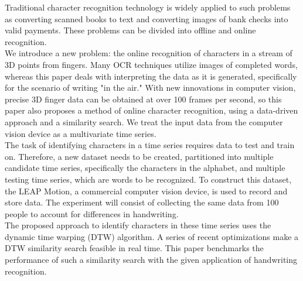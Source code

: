 Traditional character recognition technology is widely applied to such problems as converting scanned books to text and converting images of bank checks into valid payments. These problems can be divided into offline and online recognition.\\
We introduce a new problem: the online recognition of characters in a stream of 3D points from fingers. Many OCR techniques utilize images of completed words, whereas this paper deals with interpreting the data as it is generated, specifically for the scenario of writing "in the air."  
With new innovations in computer vision, precise 3D finger data can be obtained at over 100 frames per second, so this paper also proposes a method of online character recognition, using a data-driven approach and a similarity search. We treat the input data from the computer vision device as a multivariate time series.\\
The task of identifying characters in a time series requires data to test and train on. Therefore, a new dataset needs to be created, partitioned into multiple candidate time series, specifically the characters in the alphabet, and multiple testing time series, which are words to be recognized. To construct this dataset, the LEAP Motion, a commercial computer vision device, is used to record and store data. The experiment will consist of collecting the same data from 100 people to account for differences in handwriting.\\
The proposed approach to identify characters in these time series uses the dynamic time warping (DTW) algorithm. A series of recent optimizations make a DTW similarity search feasible in real time. This paper benchmarks the performance of such a similarity search with the given application of handwriting recognition.\\
